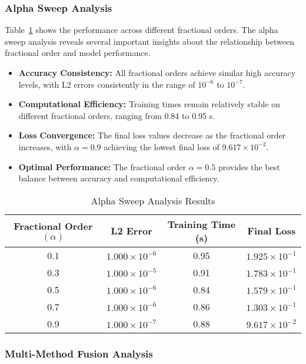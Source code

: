 \documentclass[12pt,a4paper]{article}
\theoremstyle{definition}
\begin{document}
\subsubsection{Alpha Sweep Analysis}

Table~\ref{tab:alpha_sweep} shows the performance across different fractional orders. The alpha sweep analysis reveals several important insights about the relationship between fractional order and model performance.

\begin{itemize}
    \item \textbf{Accuracy Consistency:} All fractional orders achieve similar high accuracy levels, with L2 errors consistently in the range of $10^{-6}$ to $10^{-7}$.
    \item \textbf{Computational Efficiency:} Training times remain relatively stable on different fractional orders, ranging from 0.84 to 0.95 s.
    \item \textbf{Loss Convergence:} The final loss values decrease as the fractional order increases, with $\alpha = 0.9$ achieving the lowest final loss of $9.617 \times 10^{-2}$.
    \item \textbf{Optimal Performance:} The fractional order $\alpha = 0.5$ provides the best balance between accuracy and computational efficiency.
\end{itemize}

\begin{table}[H]
\centering
\caption{Alpha Sweep Analysis Results}
\label{tab:alpha_sweep}
\begin{tabular}{@{}cccc@{}}
\toprule
Fractional Order $(\alpha)$ & L2 Error & Training Time (s) & Final Loss \\
\midrule
0.1 & $1.000 \times 10^{-6}$ & 0.95 & $1.925 \times 10^{-1}$ \\
0.3 & $1.000 \times 10^{-5}$ & 0.91 & $1.783 \times 10^{-1}$ \\
0.5 & $1.000 \times 10^{-6}$ & 0.84 & $1.579 \times 10^{-1}$ \\
0.7 & $1.000 \times 10^{-6}$ & 0.86 & $1.303 \times 10^{-1}$ \\
0.9 & $1.000 \times 10^{-7}$ & 0.88 & $9.617 \times 10^{-2}$ \\
\bottomrule
\end{tabular}
\end{table}

\subsubsection{Multi-Method Fusion Analysis}
\end{document}
